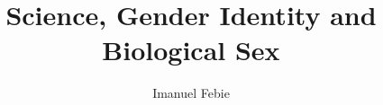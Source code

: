 \documentclass[12pt]{article}
\begin{document}
\title{Science, Gender Identity and Biological Sex}
\author{Imanuel Febie}
\maketitle


 
 

 

 
 
\end{document}
